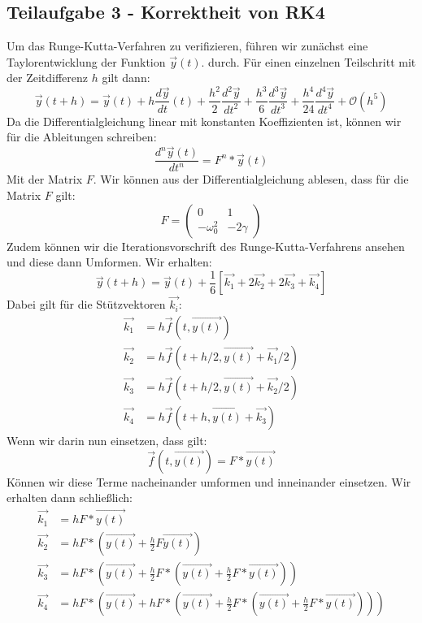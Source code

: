 \documentclass[12pt,a4paper]{article}
\begin{document}
\subsection{Teilaufgabe 3 - Korrektheit von RK4}
Um das Runge-Kutta-Verfahren zu verifizieren, führen wir zunächst eine Taylorentwicklung der Funktion $\vec{y}(t)$. durch. Für einen einzelnen Teilschritt mit der Zeitdifferenz $h$ gilt dann:
\begin{equation}
	\vec{y}(t+h) = \vec{y}(t) + h\frac{d\vec{y}}{dt}(t) + \frac{h^2}{2}\frac{d^2\vec{y}}{dt^2} + \frac{h^3}{6}\frac{d^3\vec{y}}{dt^3} + \frac{h^4}{24}\frac{d^4\vec{y}}{dt^4} + \mathcal{O}(h^5)
\end{equation}
Da die Differentialgleichung linear mit konstanten Koeffizienten ist, können wir für die Ableitungen schreiben:
\begin{equation*}
	\frac{d^n\vec{y}(t)}{dt^n} = F^n*\vec{y}(t)
\end{equation*}
Mit der Matrix $F$. Wir können aus der Differentialgleichung ablesen, dass für die Matrix $F$ gilt:
\begin{equation*}
	F = \begin{pmatrix}
	0 & 1 \\ -\omega_0^2 & -2\gamma
	\end{pmatrix}
\end{equation*}
Zudem können wir die Iterationsvorschrift des Runge-Kutta-Verfahrens ansehen und diese dann Umformen. Wir erhalten:
\begin{equation}
	\vec{y}(t+h) = \vec{y}(t) + \frac{1}{6}[\vec{k_1} + 2\vec{k_2} + 2\vec{k_3} + \vec{k_4}]
\end{equation}
Dabei gilt für die Stützvektoren $\vec{k_i}$:
\begin{align*}
	\vec{k_1} &= h\vec{f}(t, \vec{y(t)}) \\
	\vec{k_2} &= h\vec{f}(t+h/2, \vec{y(t)}+\vec{k_1}/2) \\
	\vec{k_3} &= h\vec{f}(t+h/2, \vec{y(t)}+\vec{k_2}/2) \\
	\vec{k_4} &= h\vec{f}(t+h , \vec{y(t)} + \vec{k_3})
\end{align*}
Wenn wir darin nun einsetzen, dass gilt:
\begin{equation*}
	\vec{f}(t, \vec{y(t)}) = F*\vec{y(t)}
\end{equation*}
Können wir diese Terme nacheinander umformen und inneinander einsetzen. Wir erhalten dann schließlich:
\begin{align}
	\vec{k_1} &= hF*\vec{y(t)} \\
	\vec{k_2} &= hF*\left(\vec{y(t)} + \frac{h}{2}F\vec{y(t)}\right) \\
	\vec{k_3} &= hF*\left(\vec{y(t)} + \frac{h}{2}F*\left(\vec{y(t)} + \frac{h}{2}F*\vec{y(t)}\right)\right) \\
	\vec{k_4} &= hF*\left(\vec{y(t)} + hF*\left(\vec{y(t)}+\frac{h}{2}F*\left(\vec{y(t)} + \frac{h}{2}F*\vec{y(t)}\right)\right)\right)
\end{align}
\end{document}
